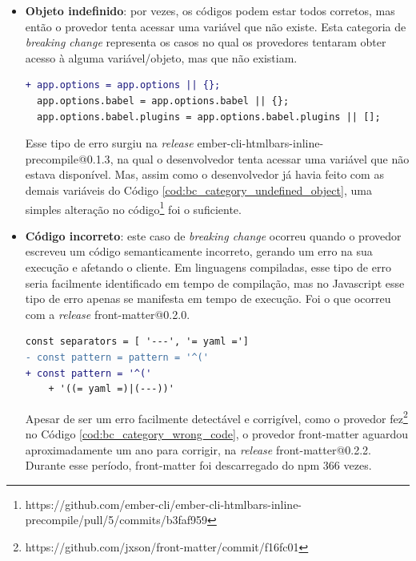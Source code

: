\begin{itemize}
    \item \textbf{Objeto indefinido}: por vezes, os códigos podem estar todos corretos, mas então o provedor tenta acessar uma variável que não existe. Esta categoria de \textit{breaking change} representa os casos no qual os provedores tentaram obter acesso à alguma variável/objeto, mas que não existiam.

    \begin{lstlisting}[numbers=none, language=diff, label=cod:bc_category_undefined_object, caption={Exemplo da categoria de \textit{Objeto Indefinido}}]
+ app.options = app.options || {};
  app.options.babel = app.options.babel || {};
  app.options.babel.plugins = app.options.babel.plugins || [];
    \end{lstlisting}

    Esse tipo de erro surgiu na \textit{release} \textsf{ember-cli-htmlbars-inline-precompile@0.1.3}, na qual o desenvolvedor tenta acessar uma variável que não estava disponível. Mas, assim como o desenvolvedor já havia feito com as demais variáveis do Código \ref{cod:bc_category_undefined_object}, uma simples alteração no código\footnote{https://github.com/ember-cli/ember-cli-htmlbars-inline-precompile/pull/5/commits/b3faf959} foi o suficiente.

    \item \textbf{Código incorreto}: este caso de \textit{breaking change} ocorreu quando o provedor escreveu um código semanticamente incorreto, gerando um erro na sua execução e afetando o cliente. Em linguagens compiladas, esse tipo de erro seria facilmente identificado em tempo de compilação, mas no \textsf{Javascript} esse tipo de erro apenas se manifesta em tempo de execução. Foi o que ocorreu com a \textit{release} \textsf{front-matter@0.2.0}.

	 \begin{lstlisting}[numbers=none, language=diff, label=cod:bc_category_wrong_code, caption={Exemplo da categoria \textit{Código incorreto}}]
  const separators = [ '---', '= yaml =']
- const pattern = pattern = '^('
+ const pattern = '^('
    + '((= yaml =)|(---))'
	 \end{lstlisting}

    Apesar de ser um erro facilmente detectável e corrigível, como o provedor fez\footnote{https://github.com/jxson/front-matter/commit/f16fc01} no Código \ref{cod:bc_category_wrong_code}, o provedor \textsf{front-matter} aguardou aproximadamente um ano para corrigir, na \textit{release} \textsf{front-matter@0.2.2}. Durante esse período, \textsf{front-matter} foi descarregado do \textsf{npm} 366 vezes.


\end{itemize}
